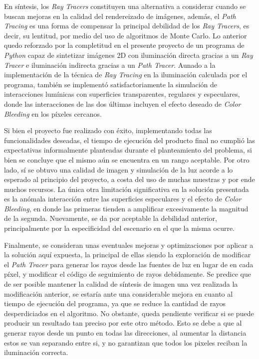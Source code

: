 \documentclass[conference]{IEEEtran}
\begin{document}
En síntesis, los \textit{Ray Tracers} constituyen una alternativa a considerar cuando se buscan mejoras en la calidad del rendereizado de imágenes, además, el \textit{Path Tracing} es una forma de compensar la principal debilidad de los \textit{Ray Tracers}, es decir, su lentitud, por medio del uso de algoritmos de Monte Carlo. Lo anterior quedo reforzado por la completitud en el presente proyecto de un programa de \textit{Python} capaz de sintetizar imágenes 2D con iluminación directa gracias a un \textit{Ray Tracer} e iluminación indirecta gracias a un \textit{Path Tracer}. Aunado a la implementación de la técnica de \textit{Ray Tracing} en la iluminación calculada por el programa, también se implementó satisfactoriamente la simulación de interacciones lumínicas con superficies transparentes, regulares y especulares, donde las interacciones de las dos últimas incluyen el efecto deseado de \textit{Color Bleeding} en los píxeles cercanos.

Si bien el proyecto fue realizado con éxito, implementando todas las funcionalidades deseadas, el tiempo de ejecución del producto final no cumplió las expectativas informalmente planteadas durante el planteamiento del problema, si bien se concluye que el mismo aún se encuentra en un rango aceptable. Por otro lado, sí se obtuvo una calidad de imagen y simulación de la luz acorde a lo esperado al principio del proyecto, a costa del uso de muchas muestras y por ende muchos recursos. La única otra limitación significativa en la solución presentada es la anómala interacción entre las superficies especulares y el efecto de \textit{Color Bleeding}, en donde las primeras tienden a amplificar excesivamente la magnitud de la segunda. Nuevamente, se da por aceptable la debilidad anterior, principalmente por la especificidad del escenario en el que la misma ocurre. 

Finalmente, se consideran unas eventuales mejoras y optimizaciones por aplicar a la solución aquí expuesta, la principal de ellas siendo la exploración de modificar el \textit{Path Tracer} para generar los rayos desde las fuentes de luz en lugar de en cada píxel, y modificar el código de seguimiento de rayos debidamente. Se predice que de ser posible mantener la calidad de síntesis de imagen una vez realizada la modificación anterior, se estaría ante una considerable mejora en cuanto al tiempo de ejecución del programa, ya que se reduce la cantidad de rayos desperdiciados en el algoritmo. No obstante, queda pendiente verificar si se puede producir un resultado tan preciso por este otro método. Esto se debe a que al generar rayos desde un punto en todas las direcciones, al aumentar la distancia estos se van separando entre si, y no garantizan que todos los pixeles reciban la iluminación correcta. 
\end{document}
